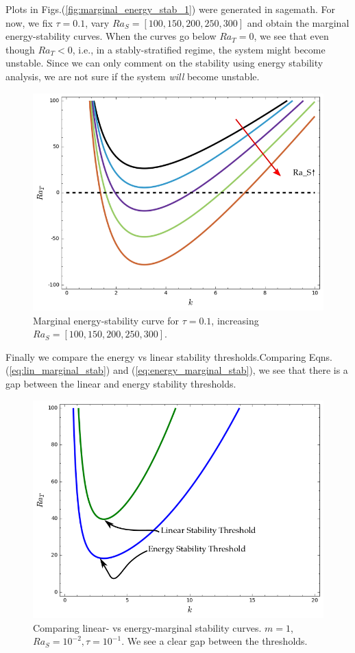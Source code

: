 \documentclass{article}
\begin{document}
Plots in Figs.(\ref{fig:marginal_energy_stab_1}) were generated in sagemath. 
For now, we fix $\tau = 0.1$, vary $Ra_{S} = [100, 150, 200, 250, 300]$ and obtain the marginal energy-stability curves. When the curves go below $Ra_{T} = 0$, we see that even though $Ra_{T} < 0$, i.e., in a stably-stratified regime, the system might become unstable. Since we can only comment on the stability using energy stability analysis, we are not sure if the system \textit{will} become unstable.  
\begin{figure}[H]
    \centering
    \includegraphics[scale = 0.3]{Figs/energy_stab_Ra_T_vs_k_tau_0_1_vary_Ra_S.png}
    \caption{Marginal energy-stability curve for $\tau = 0.1$, increasing $Ra_{S} = [100, 150, 200, 250, 300]$.}
    \label{fig:energy_stab_Ra_T_vs_k_tau_0_1_vary_Ra_S}
\end{figure}
Finally we compare the energy vs linear stability thresholds.Comparing Eqns.(\ref{eq:lin_marginal_stab}) and (\ref{eq:energy_marginal_stab}), we see that there is a gap between the linear and energy stability thresholds. 
\begin{figure}[H]
    \centering
    \includegraphics[scale = 0.3]{Figs/lin_vs_energy_stab.png}
    \caption{Comparing linear- vs energy-marginal stability curves. $m = 1$, $Ra_S = 10^{-2}, \tau = 10^{-1}$. We see a clear gap between the thresholds.}
    \label{fig:lin_vs_energy_stab}
\end{figure}
\end{document}
